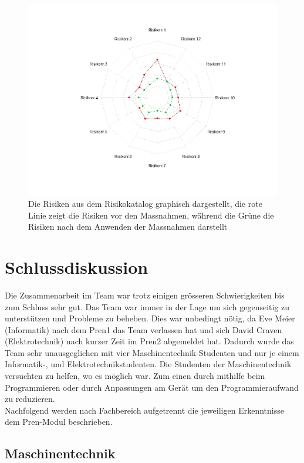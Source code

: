 \documentclass[a4paper]{report}
\begin{document}
\begin{figure}[h!]
	\centering
	\includegraphics[width=\textwidth,keepaspectratio]{Risikomatrix_Spinne}
	\caption{Die Risiken aus dem Risikokatalog graphisch dargestellt, die rote Linie zeigt die Risiken vor den Massnahmen, während die Grüne die Risiken nach dem Anwenden der Massnahmen darstellt}
	\label{fig:Risikomatrix_Spinne}
\end{figure}


\chapter{Schlussdiskussion}
\label{ch:SchlussDisku}
Die Zusammenarbeit im Team war trotz einigen grösseren Schwierigkeiten bis zum Schluss sehr gut. Das Team war immer in der Lage um sich gegenseitig zu unterstützen und Probleme zu beheben. Dies war unbedingt nötig, da Eve Meier (Informatik) nach dem Pren1 das Team verlassen hat und sich David Craven (Elektrotechnik) nach kurzer Zeit im Pren2 abgemeldet hat. Dadurch wurde das Team sehr unausgeglichen mit vier Maschinentechnik-Studenten und nur je einem Informatik-, und Elektrotechnikstudenten. Die Studenten der Maschinentechnik versuchten zu helfen, wo es möglich war. Zum einen durch mithilfe beim Programmieren oder durch Anpassungen am Gerät um den Programmieraufwand zu reduzieren.\\
Nachfolgend werden nach Fachbereich aufgetrennt die jeweiligen Erkenntnisse dem Pren-Modul beschrieben.

\section{Maschinentechnik}
\end{document}
